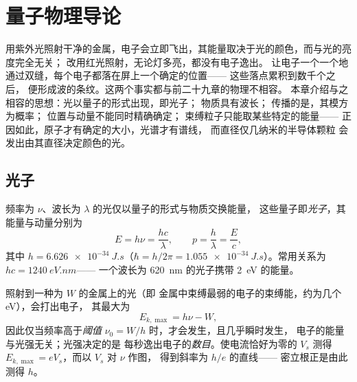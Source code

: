 \chapter{量子物理导论}\label{ch:b1:quantum-introduction}

用紫外光照射干净的金属，电子会立即飞出，其能量取决于光的颜色，而与光的亮度完全无关；
改用红光照射，无论灯多亮，都没有电子逸出。
让电子一个一个地通过双缝，每个电子都落在屏上一个确定的位置——
这些落点累积到数千个之后，
便形成波的条纹。这两个事实都与前二十九章的物理不相容。
本章介绍与之相容的思想：光以量子的形式出现，即光子；
物质具有波长；
传播的是，其模方为概率；
位置与动量不能同时精确确定；
束缚粒子只能取某些特定的能量——
正因如此，原子才有确定的大小，光谱才有谱线，
而直径仅几纳米的半导体颗粒
会发出由其直径决定颜色的光。

\section{光子}

\begin{theorem}\label{thm:b1:quantum-introduction:photon}
频率为 $\nu$、波长为 $\lambda$ 的光仅以量子的形式与物质交换能量，
这些量子即\emph{光子}，其能量与动量分别为
\[
E = h\nu = \frac{hc}{\lambda} , \qquad p = \frac{h}{\lambda} = \frac{E}{c} ,
\]
其中\emph{} $h = \qty{6.626e-34}{J.s}$（$\hbar = h/2\pi =
\qty{1.055e-34}{J.s}$）。常用关系为 $hc = \qty{1240}{eV.nm}$——
一个波长为 \qty{620}{nm} 的光子携带 \qty{2}{eV} 的能量。
\end{theorem}
\admitted

\begin{proposition}[光电效应]\label{prop:b1:quantum-introduction:photoelectric}
照射到一种\emph{}为 $W$ 的金属上的光（即
金属中束缚最弱的电子的束缚能，约为几个 eV），会打出电子，
其最大为
\[
E_{k,\max} = h\nu - W ,
\]
因此仅当频率高于\emph{阈值} $\nu_0 = W/h$ 时，才会发生，且几乎瞬时发生，
电子的能量与光强无关；光强决定的是
每秒逸出电子的\emph{数目}。使电流恰好为零的\emph{}
$V_s$ 测得 $E_{k,\max} = eV_s$，而以 $V_s$ 对 $\nu$ 作图，
得到斜率为 $h/e$ 的直线——
密立根正是由此测得 $h$。
\end{proposition}

